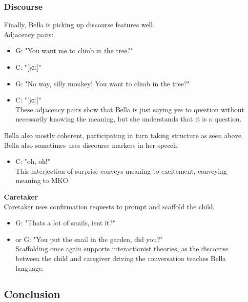 \documentclass[
]{article}
\providecommand{\tightlist}{%
  \setlength{\itemsep}{0pt}\setlength{\parskip}{0pt}}
\begin{document}
\hypertarget{discourse}{%
\subsubsection{Discourse}\label{discourse}}

Finally, Bella is picking up discourse features well.\\
Adjacency pairs:

\begin{itemize}
\tightlist
\item
  G: "You want me to climb in the tree?"
\item
  C: "{[}jɑː{]}"
\item
  G: "No way, silly monkey! You want to climb in the tree?"
\item
  C: "{[}jɑː{]}"\\
  These adjacency pairs show that Bella is just saying yes to question
  without necessarily knowing the meaning, but she understands that it
  is a question.
\end{itemize}

Bella also mostly coherent, participating in turn taking structure as
seen above. Bella also sometimes uses discourse markers in her speech:

\begin{itemize}
\tightlist
\item
  C: "oh, oh!"\\
  This interjection of surprise conveys meaning to excitement, conveying
  meaning to MKO.
\end{itemize}

\textbf{Caretaker}\\
Caretaker uses confirmation requests to prompt and scaffold the child.

\begin{itemize}
\tightlist
\item
  G: "That\textquotesingle s a lot of snails, isn\textquotesingle t it?"
\item
  or G: "You put the snail in the garden, did you?"\\
  Scaffolding once again supports interactionist theories, as the
  discourse between the child and caregiver driving the conversation
  teaches Bella language.
\end{itemize}

\hypertarget{conclusion}{%
\subsection{Conclusion}\label{conclusion}}
\end{document}
